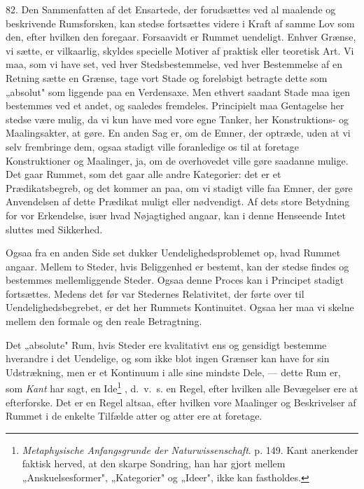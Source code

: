 \documentclass[12pt,a4paper]{book}
\newcommand{\opage}[1]{\marginnote{\footnotesize\textit{[#1]}}}
\begin{document}
82. Den Sammenfatten af det Ensartede, der forudsættes ved al maalende
og beskrivende Rumsforsken, kan stedse fortsættes videre i Kraft af
samme Lov som den, efter hvilken den foregaar. Forsaavidt er Rummet
uendeligt. Enhver Grænse, vi sætte, er vilkaarlig, skyldes specielle
Motiver af praktisk eller teoretisk Art. Vi maa, som vi have set, ved
hver Stedsbestemmelse, ved hver Bestemmelse af en Retning sætte en
Grænse, tage vort Stade og foreløbigt betragte dette som „absolut" som
liggende paa en Verdensaxe. Men ethvert saadant Stade maa igen
bestemmes ved et andet, og saaledes fremdeles. Principielt maa
Gentagelse her stedse være mulig, da vi kun have med vore egne Tanker,
her Konstruktions- og Maalingsakter, at gøre. En anden Sag er, om de Emner, der optræde, uden at vi selv frembringe dem, ogsaa stadigt ville
foranledige os til at foretage Konstruktioner og Maalinger, ja, om de
overhovedet ville gøre saadanne mulige. Det gaar Rummet, som det gaar
alle andre Kategorier: det er et Prædikatsbegreb, og det kommer an paa,
om vi stadigt ville faa Emner, der gøre Anvendelsen af dette Prædikat
muligt eller nødvendigt. Af dets store Betydning for vor Erkendelse,
især hvad Nøjagtighed angaar, kan i denne Henseende Intet sluttes med
Sikkerhed.

Ogsaa fra en anden Side set dukker Uendelighedsproblemet op, hvad Rummet
angaar. Mellem to Steder, hvis Beliggenhed er bestemt, kan der stedse
findes og bestemmes mellemliggende Steder. Ogsaa denne Proces kan i
Principet stadigt fortsættes. Medens det før var Stedernes Relativitet,
der førte over til Uendelighedsbegrebet, er det her Rummets Kontinuitet.
Ogsaa her maa vi skelne mellem den formale og den reale Betragtning.

Det „absolute" Rum, hvis Steder ere kvalitativt ens og gensidigt
bestemme hverandre i det Uendelige, og som ikke blot ingen Grænser kan
have for sin Udstrækning, men er et Kontinuum i alle sine mindste Dele,
--- dette Rum er, \opage{201} som \emph{Kant} har sagt, en Ide\footnote{\emph{Metaphysische Anfangsgrunde der Naturwissenschaft}. p. 149. Kant anerkender faktisk herved, at
den skarpe Sondring, han har gjort mellem „Anskuelsesformer", „Kategorier" og
„Ideer", ikke kan fastholdes.} , d.\ v.\ s. en Regel, efter hvilken alle
Bevægelser ere at efterforske. Det er en Regel altsaa, efter hvilken vore
Maalinger og Beskrivelser af Rummet i de enkelte Tilfælde atter og atter ere at
foretage.
\end{document}
